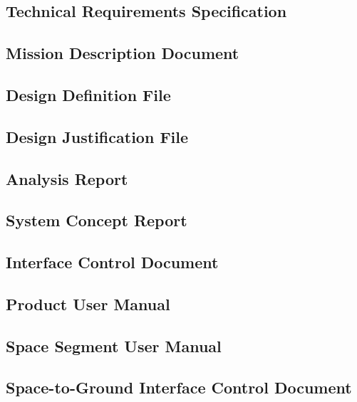\subsection{Technical Requirements Specification}
\label{sec:Technical Requirements Specification}


\subsection{Mission Description Document}
\label{sec:Mission Description Document}


\subsection{Design Definition File}
\label{sec:Design Definition File}


\subsection{Design Justification File}
\label{sec:Design Justification File}


\subsection{Analysis Report}
\label{sec:Analysis Report}


\subsection{System Concept Report}
\label{sec:System Concept Report}


\subsection{Interface Control Document}
\label{sec:Interface Control Document}


\subsection{Product User Manual}
\label{sec:Product User Manual}


\subsection{Space Segment User Manual}
\label{sec:Space Segment User Manual}


\subsection{Space-to-Ground Interface Control Document}
\label{sec:Space-to-Ground Interface Control Document}


